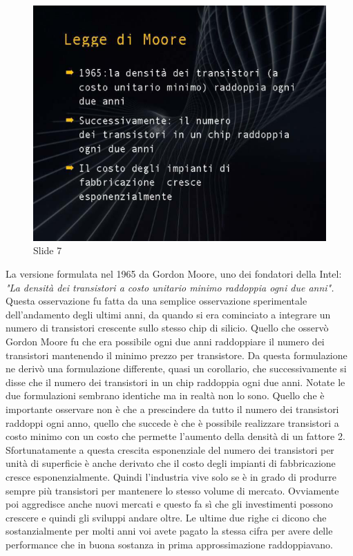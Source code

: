\begin{figure}[ht]
    \centering
    \includegraphics[width=0.6\linewidth]{images/Lez01_p02_fig_01.png}
    \caption{Slide 7}
    \label{fig:slide_7}
\end{figure}

La versione formulata nel 1965 da Gordon Moore, uno dei fondatori della Intel: \textit{"La densità dei transistori a costo unitario minimo raddoppia ogni due anni".}
Questa osservazione fu fatta da una semplice osservazione sperimentale dell'andamento degli ultimi anni, da quando si era cominciato a integrare un numero di transistori crescente sullo stesso chip di silicio.
Quello che osservò Gordon Moore fu che era possibile ogni due anni raddoppiare il numero dei transistori mantenendo il minimo prezzo per transistore.
Da questa formulazione ne derivò una formulazione differente, quasi un corollario, che successivamente si disse che il numero dei transistori in un chip raddoppia ogni due anni.
Notate le due formulazioni sembrano identiche ma in realtà non lo sono.
Quello che è importante osservare non è che a prescindere da tutto il numero dei transistori raddoppi ogni anno, quello che succede è che è possibile realizzare transistori a costo minimo con un costo che permette l'aumento della densità di un fattore 2.
Sfortunatamente a questa crescita esponenziale del numero dei transistori per unità di superficie è anche derivato che il costo degli impianti di fabbricazione cresce esponenzialmente.
Quindi l'industria vive solo se è in grado di produrre sempre più transistori per mantenere lo stesso volume di mercato.
Ovviamente poi aggredisce anche nuovi mercati e questo fa sì che gli investimenti possono crescere e quindi gli sviluppi andare oltre.
Le ultime due righe ci dicono che sostanzialmente per molti anni voi avete pagato la stessa cifra per avere delle performance che in buona sostanza in prima approssimazione raddoppiavano.

